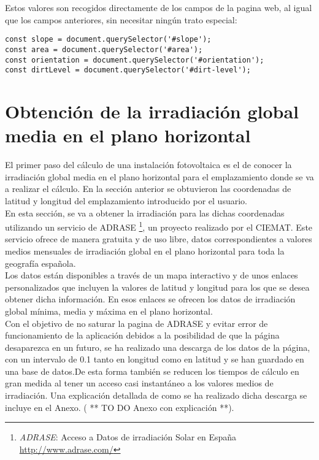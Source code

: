 Estos valores son recogidos directamente de los campos de la pagina web, al igual que los campos anteriores, sin necesitar ningún trato especial:\\
\begin{lstlisting}[style=ES6, caption={Variables correspondientes a los campos indicados}]
const slope = document.querySelector('#slope');
const area = document.querySelector('#area');
const orientation = document.querySelector('#orientation');
const dirtLevel = document.querySelector('#dirt-level');
\end{lstlisting}

\section{Obtención de la irradiación global media en el plano horizontal}
\label{section:get_global_rad}

El primer paso del cálculo de una instalación fotovoltaica es el de conocer la irradiación global media en el plano horizontal para el emplazamiento donde se va a realizar el cálculo. En la sección anterior se obtuvieron las coordenadas de latitud y longitud del emplazamiento introducido por el usuario.\\

En esta sección, se va a obtener la irradiación para las dichas coordenadas utilizando un servicio de ADRASE \footnote{\textit{ADRASE}: Acceso a Datos de irradiación Solar en España \url{http://www.adrase.com/}}, un proyecto realizado por el CIEMAT. Este servicio ofrece de manera gratuita y de uso libre, datos correspondientes a valores medios mensuales de irradiación global en el plano horizontal para toda la geografía española.\\

Los datos están disponibles a través de un mapa interactivo y de unos enlaces personalizados que incluyen la valores de latitud y longitud para los que se desea obtener dicha información. En esos enlaces se ofrecen los datos de irradiación global mínima, media y máxima en el plano horizontal.\\

Con el objetivo de no saturar la pagina de ADRASE y evitar error de funcionamiento de la aplicación debidos a la posibilidad de que la página desaparezca en un futuro, se ha realizado una descarga de los datos de la página, con un intervalo de 0.1 tanto en longitud como en latitud y se han guardado en una base de datos.De esta forma también se reducen los tiempos de cálculo en gran medida al tener un acceso casi instantáneo a los valores medios de irradiación. 
Una explicación detallada de como se ha realizado dicha descarga se incluye en el Anexo. ( ** TO DO Anexo con explicación **).
\newpage

